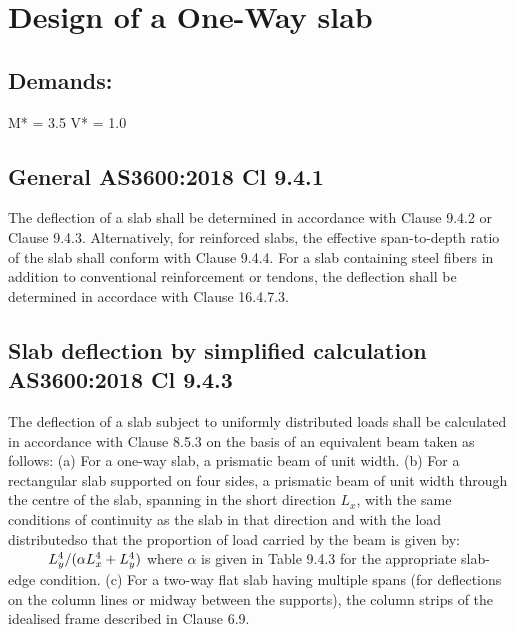 \documentclass{article}%
\begin{document}
%
\normalsize%
\section*{Design of a One{-}Way slab}%
\label{sec:DesignofaOne{-}Wayslab}%
\subsection*{Demands:}%
\label{subsec:Demands}%

%
M* = 3.5%
\newline%
V* = 1.0%
\newline%
%
\subsection*{General AS3600:2018 Cl 9.4.1}%
\label{subsec:GeneralAS36002018Cl9.4.1}%

%
The deflection of a slab shall be determined in accordance with Clause 9.4.2 or Clause 9.4.3.\newline%
\newline%
Alternatively, for reinforced slabs, the effective span{-}to{-}depth ratio of the slab shall conform with Clause 9.4.4.\newline%
\newline%
For a slab containing steel fibers in addition to conventional reinforcement or tendons, the deflection shall be determined in accordace with Clause 16.4.7.3.\newline%
%
\subsection*{Slab deflection by simplified calculation  AS3600:2018 Cl 9.4.3}%
\label{subsec:SlabdeflectionbysimplifiedcalculationAS36002018Cl9.4.3}%

%
The deflection of a slab subject to uniformly distributed loads shall be calculated in accordance with Clause 8.5.3 on the basis of an equivalent beam taken as follows:\newline%
\newline%
(a)	For a one{-}way slab, a prismatic beam of unit width.\newline%
\newline%
(b)	For a rectangular slab supported on four sides, a prismatic beam of unit width through the centre of the slab, spanning in the short direction %
$L_{x}$, with the same conditions of continuity as the slab in that direction and with the load distributedso that the proportion of load carried by the beam is given by:%
\newline%
\newline%
%
$\hspace*{10mm} L_{y}^{4} / (\alpha L_{x}^{4} + L_{y}^{4})$%
\newline%
\newline%
where %
 $\alpha$ is given in Table 9.4.3 for the appropriate slab-edge condition.%
\newline%
\newline%
(c)	 For a two{-}way flat slab having multiple spans (for deflections on the column lines or midway between the supports), the column strips of the idealised frame described in Clause 6.9.%
\end{document}
